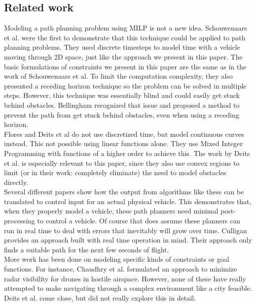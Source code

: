 \subsection{Related work}
Modeling a path planning problem using MILP is not a new idea. Schouwenaars et al. \cite{Schouwenaars2001} were the first to demonstrate that this technique could be applied to path planning problems. They used discrete timesteps to model time with a vehicle moving through 2D space, just like the approach we present in this paper. The basic formulations of constraints we present in this paper are the same as in the work of Schouwenaars et al. To limit the computation complexity, they also presented a receding horizon technique so the problem can be solved in multiple steps. However, this technique was essentially blind and could easily get stuck behind obstacles. Bellingham\cite{Bellingham2002} recognized that issue and proposed a method to prevent the path from get stuck behind obstacles, even when using a receding horizon. \\

Flores\cite{Flores2007} and Deits et al\cite{Deits2015} do not use discretized time, but model continuous curves instead. This not possible using linear functions alone. They use Mixed Integer Programming with functions of a higher order to achieve this. The work by Deits et al. is especially relevant to this paper, since they also use convex regions to limit (or in their work: completely eliminate) the need to model obstacles directly. \\

Several different papers \cite{Fliess1995a, Hao2005, Cowling2007, Mellinger2011} show how the output from algorithms like these can be translated to control input for an actual physical vehicle. This demonstrates that, when they properly model a vehicle, these path planners need minimal post-processing to control a vehicle. Of course that does assume these planners can run in real time to deal with errors that inevitably will grow over time. Culligan \cite{Culligan2006} provides an approach built with real time operation in mind. Their approach only finds a suitable path for the next few seconds of flight. \\

More work has been done on modeling specific kinds of constraints or goal functions. For instance, Chaudhry et al. \cite{Chaudhry2004} formulated an approach to minimize radar visibility for drones in hostile airspace. However, none of these have really attempted to make navigating through a complex environment like a city feasible. Deits et al. \cite{Deits2015} come close, but did not really explore this in detail.